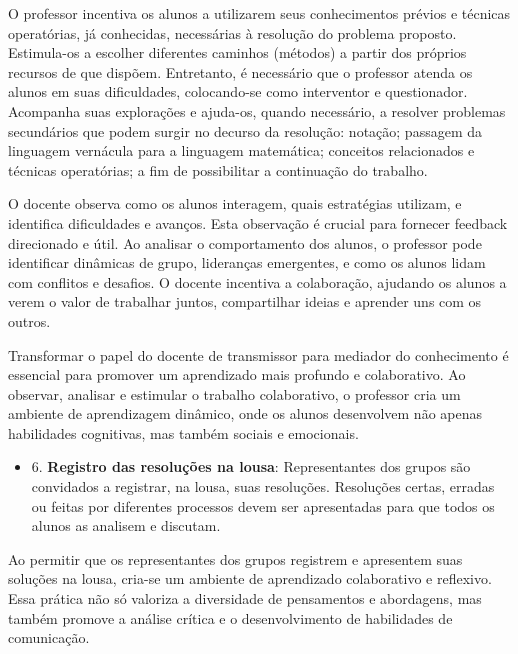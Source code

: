 \begin{citacao}
    O professor incentiva os alunos a utilizarem seus conhecimentos prévios e técnicas operatórias, já conhecidas, necessárias à resolução do problema proposto. Estimula-os a escolher diferentes caminhos (métodos) a partir dos próprios recursos de que dispõem. Entretanto, é necessário que o professor atenda os alunos em suas dificuldades, colocando-se como interventor e questionador. Acompanha suas explorações e ajuda-os, quando necessário, a resolver problemas secundários que podem surgir no decurso da resolução: notação; passagem da linguagem vernácula para a linguagem matemática; conceitos relacionados e técnicas operatórias; a fim de possibilitar a continuação do trabalho. \cite{BOLEMAAllevatoOnuchic2011}
\end{citacao}

O docente observa como os alunos interagem, quais estratégias utilizam, e identifica dificuldades e avanços. Esta observação é crucial para fornecer feedback direcionado e útil. Ao analisar o comportamento dos alunos, o professor pode identificar dinâmicas de grupo, lideranças emergentes, e como os alunos lidam com conflitos e desafios. O docente incentiva a colaboração, ajudando os alunos a verem o valor de trabalhar juntos, compartilhar ideias e aprender uns com os outros.

Transformar o papel do docente de transmissor para mediador do conhecimento é essencial para promover um aprendizado mais profundo e colaborativo. Ao observar, analisar e estimular o trabalho colaborativo, o professor cria um ambiente de aprendizagem dinâmico, onde os alunos desenvolvem não apenas habilidades cognitivas, mas também sociais e emocionais.


\begin{itemize}
    \item 6. \textbf{Registro das resoluções na lousa}: Representantes dos grupos são convidados a registrar, na lousa, suas resoluções. Resoluções certas, erradas ou feitas por diferentes processos devem ser apresentadas para que todos os alunos as analisem e discutam. \cite{BOLEMAAllevatoOnuchic2011}
\end{itemize}

Ao permitir que os representantes dos grupos registrem e apresentem suas soluções na lousa, cria-se um ambiente de aprendizado colaborativo e reflexivo. Essa prática não só valoriza a diversidade de pensamentos e abordagens, mas também promove a análise crítica e o desenvolvimento de habilidades de comunicação.

